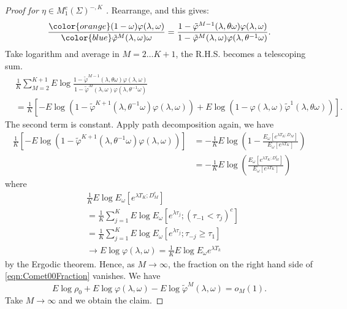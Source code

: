 \begin{proof}[Proof for $\eta \in M_1^e(\Sigma)^{-, K}$ ]
	Rearrange, and this gives:
	\begin{equation}
		\label{eqn:Comet00Fraction}
		\frac{\color{orange}(1 - \omega) \varphi(\lambda, \omega)}{\color{blue}\tilde \varphi^M(\lambda, \omega) \omega} 
		= \frac{ 1 - \tilde \varphi^{M-1}(\lambda, \theta \omega) \varphi(\lambda, \omega)}{1 - \tilde \varphi^M(\lambda, \omega)\varphi(\lambda, \theta^{-1}\omega)}
	.\end{equation} 
	Take logarithm and average in $M = 2\ldots K+1$, the R.H.S. becomes a telescoping sum. 
	\begin{align*}
	&\frac{1}{K}\sum_{M=2}^{K+1} E \log \frac{1 - \tilde \varphi^{M-1}(\lambda, \theta \omega) \varphi(\lambda, \omega)}{1 - \tilde \varphi^M(\lambda, \omega)\varphi(\lambda, \theta^{-1}\omega)}\\
	&= \frac{1}{K} \left[
	- E \log \left( 1 - \tilde \varphi^{K+1}(\lambda, \theta^{-1} \omega) \varphi(\lambda, \omega) \right) 
	+ E \log \left( 1 - \varphi(\lambda, \omega)\tilde \varphi^1(\lambda, \theta \omega) \right) 
\right] 
	.\end{align*}
	The second term is constant. Apply path decomposition again, we have
\begin{align*}
	\frac{1}{K} \left[
	- E \log \left( 1 - \tilde \varphi^{K+1}(\lambda, \theta^{-1} \omega) \varphi(\lambda, \omega) \right) \right] 
	&=  - \frac{1}{K} E \log \left( 1 - \frac{E_\omega \left[ e^{\lambda T_K; D_M} \right] }{E_\omega \left[ e^{\lambda T_K} \right] } \right)  \\
	&=  - \frac{1}{K} E \log \left( \frac{E_\omega \left[ e^{\lambda T_K; D_M^c} \right] }{E_\omega \left[ e^{\lambda T_K} \right] } \right)  
	\end{align*}
	where
	\begin{align*}
		&\frac{1}{K} E \log E_\omega \left[ e^{\lambda T_K; D_M^c} \right]\\
		&= \frac{1}{K} \sum_{j=1}^{K} E \log E_\omega \left[ e^{\lambda \tau_j}; (\tau_{-1} < \tau_j)^c \right]  \\
		&= \frac{1}{K} \sum_{j=1}^{K} E \log E_\omega \left[ e^{\lambda \tau_j}; \tau_{-j} \ge \tau_1 \right]  \\
		& \to E \log \varphi(\lambda, \omega) = \frac{1}{K} E \log E_\omega e^{\lambda T_k}
	\end{align*}
	by the Ergodic theorem. Hence, as $M \to \infty $, the fraction on the right hand side of \eqref{eqn:Comet00Fraction} vanishes. We have
	\[
		E \log \rho_0 + E \log \varphi(\lambda, \omega) - E \log \tilde\varphi^M(\lambda, \omega) = o_M(1)
	.\] 
	Take $M \to \infty $ and we obtain the claim.


\end{proof}
